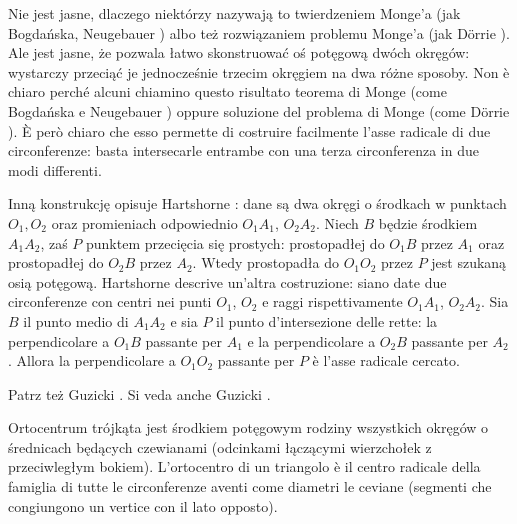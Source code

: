 Nie jest jasne, dlaczego niektórzy nazywają to twierdzeniem Monge'a (jak Bogdańska, Neugebauer \cite[s. 70]{neugebauer_2018}) albo też rozwiązaniem problemu Monge'a (jak Dörrie \cite[s. 151]{dorrie_1965}). %
Ale jest jasne, że pozwala łatwo skonstruować oś potęgową dwóch okręgów: wystarczy przeciąć je jednocześnie trzecim okręgiem na dwa różne sposoby. %
Non è chiaro perché alcuni chiamino questo risultato teorema di Monge (come Bogdańska e Neugebauer \cite[p. 70]{neugebauer_2018}) oppure soluzione del problema di Monge (come Dörrie \cite[p. 151]{dorrie_1965}). %
È però chiaro che esso permette di costruire facilmente l'asse radicale di due circonferenze: basta intersecarle entrambe con una terza circonferenza in due modi differenti. %

Inną konstrukcję opisuje Hartshorne \cite[s. 182]{hartshorne_2000}: dane są dwa okręgi o środkach w punktach $O_1, O_2$ oraz promieniach odpowiednio $O_1A_1$, $O_2A_2$. %
Niech $B$ będzie środkiem $A_1A_2$, zaś $P$ punktem przecięcia się prostych: prostopadłej do $O_1B$ przez $A_1$ oraz prostopadłej do $O_2B$ przez $A_2$. %
Wtedy prostopadła do $O_1O_2$ przez $P$ jest szukaną osią potęgową. %
Hartshorne \cite[p. 182]{hartshorne_2000} descrive un'altra costruzione: siano date due circonferenze con centri nei punti $O_1$, $O_2$ e raggi rispettivamente $O_1A_1$, $O_2A_2$. %
Sia $B$ il punto medio di $A_1A_2$ e sia $P$ il punto d'intersezione delle rette: la perpendicolare a $O_1B$ passante per $A_1$ e la perpendicolare a $O_2B$ passante per $A_2$. %
Allora la perpendicolare a $O_1O_2$ passante per $P$ è l'asse radicale cercato. %

Patrz też Guzicki \cite[s. 174]{guzicki_2021}. %
Si veda anche Guzicki \cite[p. 174]{guzicki_2021}. %

\begin{proposition}
	Ortocentrum trójkąta jest środkiem potęgowym rodziny wszystkich okręgów o średnicach będących czewianami (odcinkami łączącymi wierzchołek z przeciwległym bokiem). %
	L'ortocentro di un triangolo è il centro radicale della famiglia di tutte le circonferenze aventi come diametri le ceviane (segmenti che congiungono un vertice con il lato opposto). %
\end{proposition}

